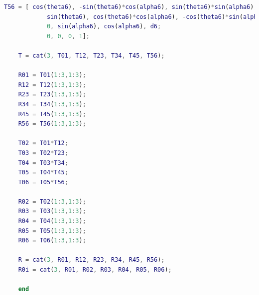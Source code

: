 \begin{lstlisting}[language=Matlab]
	T56 = [ cos(theta6), -sin(theta6)*cos(alpha6), sin(theta6)*sin(alpha6), a6*cos(theta6);
			sin(theta6), cos(theta6)*cos(alpha6), -cos(theta6)*sin(alpha6), a6*sin(theta6);
			0, sin(alpha6), cos(alpha6), d6;
			0, 0, 0, 1];
	
	T = cat(3, T01, T12, T23, T34, T45, T56);
	
	R01 = T01(1:3,1:3);
	R12 = T12(1:3,1:3);
	R23 = T23(1:3,1:3);
	R34 = T34(1:3,1:3);
	R45 = T45(1:3,1:3);
	R56 = T56(1:3,1:3);
	
	T02 = T01*T12;
	T03 = T02*T23;
	T04 = T03*T34;
	T05 = T04*T45;
	T06 = T05*T56;
	
	R02 = T02(1:3,1:3);
	R03 = T03(1:3,1:3);
	R04 = T04(1:3,1:3);
	R05 = T05(1:3,1:3);
	R06 = T06(1:3,1:3);
	
	R = cat(3, R01, R12, R23, R34, R45, R56);
	R0i = cat(3, R01, R02, R03, R04, R05, R06);
	
	end
\end{lstlisting}
\label{add:systemparameter}
%
